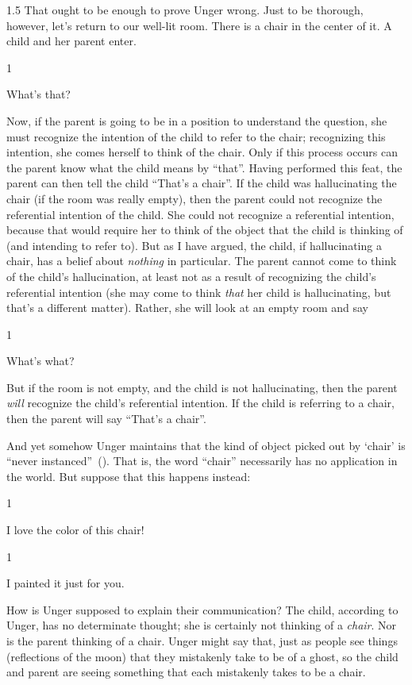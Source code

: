 \documentclass[11pt]{article}
\newcommand{\stage}[3]%
{%
	\begin{spacing}{1}%
	\vspace{0pt}
		\begin{description}[style=nextline, parsep=0pt, leftmargin=15mm, itemindent=-10mm, font=\mdseries]
			\item[\textsc{#1} \emph{#2}] #3
		\end{description}%
	\end{spacing}%
}
\begin{document}
\begin{spacing}{1.5}
That ought to be enough to prove Unger wrong. Just to be thorough, however, let's return to our well-lit room. There is a chair in the center of it. A child and her parent enter.

\stage{Child}{(pointing at the chair)}{What's that?}

Now, if the parent is going to be in a position to understand the question, she must recognize the intention of the child to refer to the chair; recognizing this intention, she comes herself to think of the chair. Only if this process occurs can the parent know what the child means by ``that''. Having performed this feat, the parent can then tell the child ``That's a chair''. If the child was hallucinating the chair (if the room was really empty), then the parent could not recognize the referential intention of the child. She could not recognize a referential intention, because that would require her to think of the object that the child is thinking of (and intending to refer to). But as I have argued, the child, if hallucinating a chair, has a belief about {\em nothing} in particular. The parent cannot come to think of the child's hallucination, at least not as a result of recognizing the child's referential intention (she may come to think {\em that} her child is hallucinating, but that's a different matter). Rather, she will look at an empty room and say

\stage{Parent}{}{What's what?}

But if the room is not empty, and the child is not hallucinating, then the parent {\em will} recognize the child's referential intention. If the child is referring to a chair, then the parent will say ``That's a chair''.

And yet somehow Unger maintains that the kind of object picked out by `chair' is ``never instanced''~(\citeyear[147]{unger1979}). That is, the word ``chair'' necessarily has no application in the world. But suppose that this happens instead: 

\stage{Child}{}{I love the color of this chair!}

\stage{Parent}{}{I painted it just for you.}

\noindent How is Unger supposed to explain their communication? The child, according to Unger, has no determinate thought; she is certainly not thinking of a {\em chair}. Nor is the parent thinking of a chair. Unger might say that, just as people see things (reflections of the moon) that they mistakenly take to be of a ghost, so the child and parent are seeing something that each mistakenly takes to be a chair.


\end{spacing}
\end{document}
